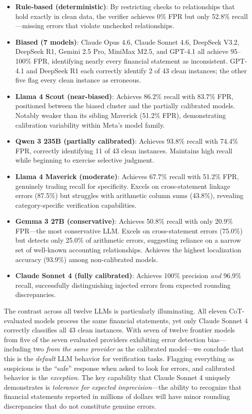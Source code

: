 \documentclass[11pt]{article}
\begin{document}
\begin{itemize}[topsep=2pt,itemsep=1pt]
    \item \textbf{Rule-based (deterministic)}: By restricting checks to relationships that hold exactly in clean data, the verifier achieves 0\% FPR but only 52.8\% recall---missing errors that violate unchecked relationships.
    \item \textbf{Biased (7 models)}: Claude Opus 4.6, Claude Sonnet 4.6, DeepSeek V3.2, DeepSeek R1, Gemini 2.5 Pro, MiniMax M2.5, and GPT-4.1 all achieve 95--100\% FPR, identifying nearly every financial statement as inconsistent.
    GPT-4.1 and DeepSeek R1 each correctly identify 2 of 43 clean instances; the other five flag every clean instance as erroneous.
    \item \textbf{Llama 4 Scout (near-biased)}: Achieves 86.2\% recall with 83.7\% FPR, positioned between the biased cluster and the partially calibrated models.
    Notably weaker than its sibling Maverick (51.2\% FPR), demonstrating calibration variability within Meta's model family.
    \item \textbf{Qwen 3 235B (partially calibrated)}: Achieves 93.8\% recall with 74.4\% FPR, correctly identifying 11 of 43 clean instances.
    Maintains high recall while beginning to exercise selective judgment.
    \item \textbf{Llama 4 Maverick (moderate)}: Achieves 67.7\% recall with 51.2\% FPR, genuinely trading recall for specificity.
    Excels on cross-statement linkage errors (87.5\%) but struggles with arithmetic column sums (43.8\%), revealing category-specific verification capabilities.
    \item \textbf{Gemma 3 27B (conservative)}: Achieves 50.8\% recall with only 20.9\% FPR---the most conservative LLM.
    Excels on cross-statement errors (75.0\%) but detects only 25.0\% of arithmetic errors, suggesting reliance on a narrow set of well-known accounting relationships.
    Achieves the highest localization accuracy (93.9\%) among non-calibrated models.
    \item \textbf{Claude Sonnet 4 (fully calibrated)}: Achieves 100\% precision \emph{and} 96.9\% recall, successfully distinguishing injected errors from expected rounding discrepancies.
\end{itemize}

The contrast across all twelve LLMs is particularly illuminating.
All eleven CoT-evaluated models process the same financial statements, yet only Claude Sonnet 4 correctly classifies all 43 clean instances.
With seven of twelve frontier models from five of the seven evaluated providers exhibiting error detection bias---including two \emph{from the same provider} as the calibrated model---we conclude that this is the \emph{default} LLM behavior for verification tasks.
Flagging everything as suspicious is the ``safe'' response when asked to look for errors, and calibrated behavior is the \emph{exception}.
The key capability that Claude Sonnet 4 uniquely demonstrates is \emph{tolerance for expected imprecision}---the ability to recognize that financial statements reported in millions of dollars will have minor rounding discrepancies that do not constitute genuine errors.
\end{document}
